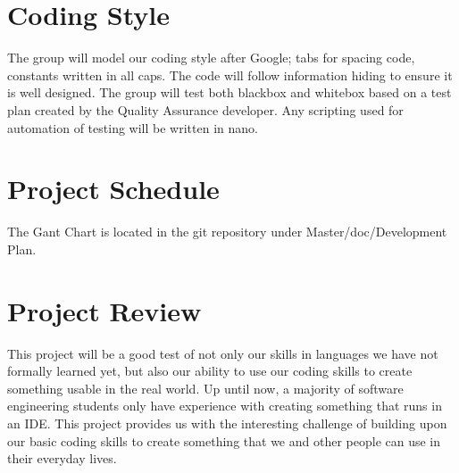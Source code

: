\documentclass{article}
\begin{document}
\section{Coding Style}
The group will model our coding style after Google; tabs for spacing code, constants written in all caps. The code will follow information hiding to ensure it is well designed. The group will test both blackbox and whitebox based on a test plan created by the Quality Assurance developer. Any scripting used for automation of testing will be written in nano.
\section{Project Schedule}
The Gant Chart is located in the git repository under Master/doc/Development Plan.
\section{Project Review}
This project will be a good test of not only our skills in languages we have not formally learned yet, but also our ability to use our coding skills to create something usable in the real world. Up until now, a majority of software engineering students only have experience with creating something that runs in an IDE. This project provides us with the interesting challenge of building upon our basic coding skills to create something that we and other people can use in their everyday lives. 
\end{document}
